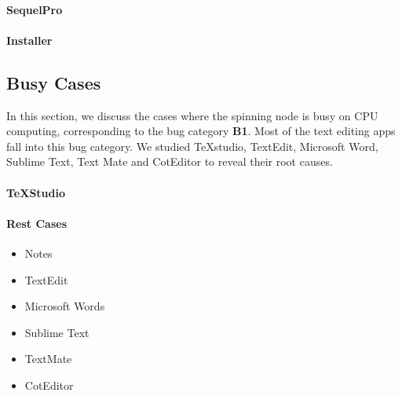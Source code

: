 \paragraph{SequelPro}

\paragraph{Installer}


\subsection{Busy Cases}
In this section, we discuss the cases where the spinning node is busy on CPU
computing, corresponding to the bug category \textbf{B1}. Most of the text
editing apps fall into this bug category. We studied TeXstudio, TextEdit,
Microsoft Word, Sublime Text, Text Mate and CotEditor to reveal their root
causes.

\paragraph{TeXStudio}

\paragraph{Rest Cases}
\begin{itemize}
  \item Notes
  \item TextEdit
  \item Microsoft Words
  \item Sublime Text
  \item TextMate
  \item CotEditor
\end{itemize}
